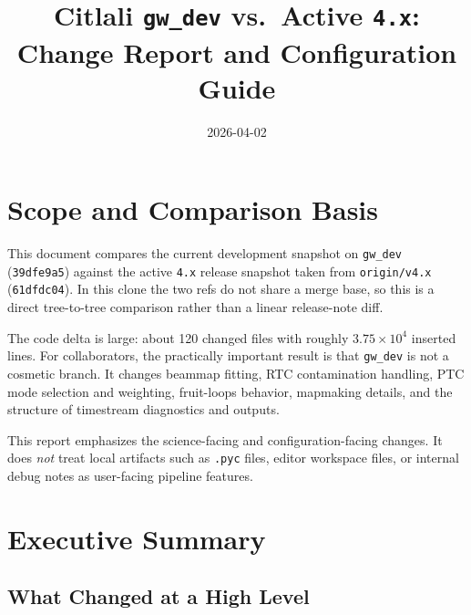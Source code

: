\documentclass[11pt]{article}
\title{Citlali \texttt{gw\_dev} vs.\ Active \texttt{4.x}:\\
Change Report and Configuration Guide}
\author{}
\date{2026-04-02}
\begin{document}
\maketitle
\tableofcontents

\section{Scope and Comparison Basis}

This document compares the current development snapshot on \texttt{gw\_dev}
(\texttt{39dfe9a5}) against the active \texttt{4.x} release snapshot taken from
\texttt{origin/v4.x} (\texttt{61dfdc04}). In this clone the two refs do not
share a merge base, so this is a direct tree-to-tree comparison rather than a
linear release-note diff.

The code delta is large: about 120 changed files with roughly
\(3.75\times 10^4\) inserted lines. For collaborators, the practically
important result is that \texttt{gw\_dev} is not a cosmetic branch. It changes
beammap fitting, RTC contamination handling, PTC mode selection and weighting,
fruit-loops behavior, mapmaking details, and the structure of timestream
diagnostics and outputs.

This report emphasizes the science-facing and configuration-facing changes. It
does \emph{not} treat local artifacts such as \texttt{.pyc} files, editor
workspace files, or internal debug notes as user-facing pipeline features.

\section{Executive Summary}

\subsection{What Changed at a High Level}
\end{document}
